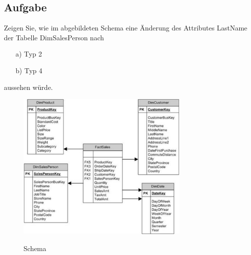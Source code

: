 \subsection{Aufgabe}
\label{subsec:uebung_12.aufgabe_15}
Zeigen Sie, wie im abgebildeten Schema eine Änderung des Attributes \glqq{}LastName\grqq{} der Tabelle \glqq{}DimSalesPerson\grqq{} nach 

\begin{itemize}[itemsep=0pt]
  \item[a)] Typ 2
  \item[b)] Typ 4
\end{itemize}

aussehen würde.


\begin{figure}[H]
  \centering
  \includegraphics[width=0.75\textwidth]{img//uebung_12_-_aufgabe_15.png}
  \label{img:uebung_12_-_aufgabe_15}
  \caption{Schema}
\end{figure}
